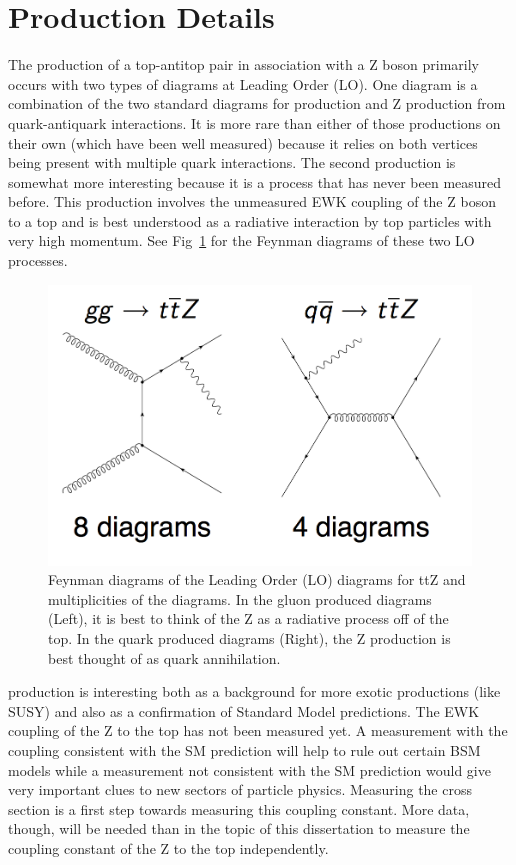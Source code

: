 	\section{\ttZ Production Details}
	The production of a top-antitop pair in association with a Z boson primarily occurs with two types of diagrams at Leading Order (LO). One diagram is a combination of the two standard diagrams for \ttbar production and Z production from quark-antiquark interactions. It is more rare than either of those productions on their own (which have been well measured) because it relies on both vertices being present with multiple quark interactions. The second production is somewhat more interesting because it is a process that has never been measured before. This production involves the unmeasured EWK coupling of the Z boson to a top and is best understood as a radiative interaction by top particles with very high momentum. See Fig~\ref{fig:ttz_LO_diagrams} for the Feynman diagrams of these two LO processes.\\
	\begin{figure}[h]
\begin{center}
\includegraphics[width=0.7\linewidth]{Figs/ttz_LO_diagrams.png}
\caption{\label{fig:ttz_LO_diagrams}
 Feynman diagrams of the Leading Order (LO) diagrams for ttZ and multiplicities of the diagrams. In the gluon produced diagrams (Left), it is best to think of the Z as a radiative process off of the top. In the quark produced diagrams (Right), the Z production is best thought of as quark annihilation.
}
\end{center}
\end{figure}

	\ttZ production is interesting both as a background for more exotic productions (like SUSY) and also as a confirmation of Standard Model predictions. The EWK coupling of the Z to the top has not been measured yet. A measurement with the coupling consistent with the SM prediction will help to rule out certain BSM models while a measurement not consistent with the SM prediction would give very important clues to new sectors of particle physics. Measuring the \ttZ cross section is a first step towards measuring this coupling constant. More data, though, will be needed than in the topic of this dissertation to measure the coupling constant of the Z to the top independently.\\
	
